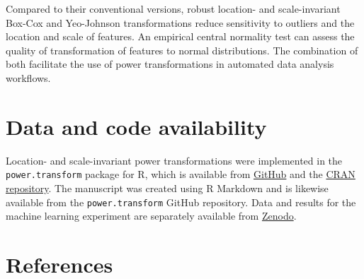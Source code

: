 \documentclass[
  a4paper,
]{article}
\begin{document}
Compared to their conventional versions, robust location- and
scale-invariant Box-Cox and Yeo-Johnson transformations reduce
sensitivity to outliers and the location and scale of features. An
empirical central normality test can assess the quality of
transformation of features to normal distributions. The combination of
both facilitate the use of power transformations in automated data
analysis workflows.

\section{Data and code availability}\label{data-and-code-availability}

Location- and scale-invariant power transformations were implemented in
the \texttt{power.transform} package for R, which is available from
\href{https://github.com/oncoray/power.transform}{GitHub} and the
\href{https://cran.r-project.org/package=power.transform}{CRAN
repository}. The manuscript was created using R Markdown and is likewise
available from the \texttt{power.transform} GitHub repository. Data and
results for the machine learning experiment are separately available
from \href{https://doi.org/10.5281/zenodo.14986689}{Zenodo}.

\section*{References}\label{references}
\end{document}

